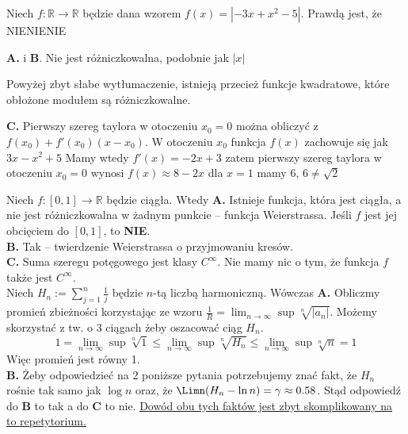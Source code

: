 \begin{solutions}
    \sol Niech $f: \mathbb{R} \to \mathbb{R}$ będzie dana wzorem $f(x) = \left|-3x+x^2-5\right|$. Prawdą jest, że
    {NIE}{NIE}{NIE}
    
    \textbf{A.} i \textbf{B}. Nie jest różniczkowalna, podobnie jak $|x|$

    \begin{editorsnote}
        Powyżej zbyt słabe wytłumaczenie, istnieją przecież funkcje kwadratowe, które obłożone modułem są różniczkowalne.
    \end{editorsnote}
    
    \textbf{C.} Pierwszy szereg taylora w otoczeniu $x_0 = 0$ można obliczyć z $f(x_0) + f'(x_0)(x-x_0)$. W otoczeniu $x_0$ funkcja $f(x)$ zachowuje się jak $3x-x^2 + 5$ Mamy wtedy $f'(x) = -2x +3$ zatem pierwszy szereg taylora w otoczeniu $x_0 = 0$ wynosi $f(x) \approx 8 - 2x$ dla $x = 1$ mamy $6$, $6 \neq \sqrt{2}$ 
    
    \sol Niech $f: [0, 1] \to \mathbb{R}$ będzie ciągła. Wtedy
    \textbf{A.} Istnieje funkcja, która jest ciągła, a nie jest różniczkowalna w żadnym punkcie -- funkcja Weierstrassa. Jeśli $f$ jest jej obcięciem do $[0,1]$, to \textbf{NIE}. \\
    \textbf{B.} Tak -- twierdzenie Weierstrassa o przyjmowaniu kresów. \\
    \textbf{C.} Suma szeregu potęgowego jest klasy $C^{\infty}$. Nie mamy nic o tym, że funkcja $f$ także jest $C^{\infty}$. \\

    \sol Niech $H_n := \sum_{j=1}^n \frac{1}{j}$ będzie $n$-tą liczbą harmoniczną. Wówczas
    \textbf{A.} Obliczmy promień zbieżności korzystając ze wzoru $\frac{1}{R} = \lim_{n \to \infty} \sup \sqrt[n]{|a_n|}$. Możemy skorzystać z tw. o 3 ciągach żeby oszacować ciąg $H_n$.
    $$
    1 = \lim_{n \to \infty} \sup \sqrt[n]{1} \leq \lim_{n \to \infty} \sup \sqrt[n]{H_n} 
    \leq \lim_{n \to \infty} \sup \sqrt[n]{n} = 1
    $$
    Więc promień jest równy 1.\\
    \textbf{B.} Żeby odpowiedzieć na 2 poniższe pytania potrzebujemy znać fakt, że $H_n$ rośnie tak samo jak $\log{n}$ oraz, że $\Limn (H_n - \ln n) = \gamma \approx 0.58$. Stąd odpowiedź do \textbf{B} to tak a do \textbf{C} to nie. \href{https://en.wikipedia.org/wiki/Harmonic_series_%28mathematics%29#Partial_sums}{Dowód obu tych faktów jest zbyt skomplikowany na to repetytorium.}
    

\end{solutions}
